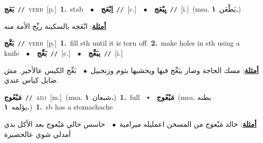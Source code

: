 \documentclass[10pt,a4paper,twoside]{article} %
\begin{document}
\begin{multicols}{2}
{\setlength\topsep{0pt}\textbf{\foreignlanguage{arabic}{بَعَج}}\ {\color{gray}\texttt{//}\color{black}}\ \textsc{verb}\ [p.]\ \textbf{1.}~stab\ \ $\bullet$\ \ \setlength\topsep{0pt}\textbf{\foreignlanguage{arabic}{اِبْعَج}}\ {\color{gray}\texttt{//}\color{black}}\ [c.]\ \ $\bullet$\ \ \setlength\topsep{0pt}\textbf{\foreignlanguage{arabic}{يِبْعَج}}\ {\color{gray}\texttt{//}\color{black}}\ [i.]\ \color{gray}(msa. \foreignlanguage{arabic}{يَطْعَن}~\foreignlanguage{arabic}{\textbf{١.}})\color{black}\  \begin{flushright}\color{gray}\foreignlanguage{arabic}{\textbf{\underline{\foreignlanguage{arabic}{أمثلة}}}: ابْعَجه بالسكينة ريِّح الأمة منه}\end{flushright}\color{black}} \vspace{2mm}

{\setlength\topsep{0pt}\textbf{\foreignlanguage{arabic}{بَعَّج}}\ {\color{gray}\texttt{//}\color{black}}\ \textsc{verb}\ [p.]\ \textbf{1.}~fill sth until it is torn off.  \textbf{2.}~make holes in sth using a knife\ \ $\bullet$\ \ \setlength\topsep{0pt}\textbf{\foreignlanguage{arabic}{بَعِّج}}\ {\color{gray}\texttt{//}\color{black}}\ [c.]\ \ $\bullet$\ \ \setlength\topsep{0pt}\textbf{\foreignlanguage{arabic}{يبَعِّج}}\ {\color{gray}\texttt{//}\color{black}}\ [i.]\  \begin{flushright}\color{gray}\foreignlanguage{arabic}{\textbf{\underline{\foreignlanguage{arabic}{أمثلة}}}: مسك الجاجة وصار يبَعِّج فيها ويحشيها بثوم وزنجبيل\ $\bullet$\ \  بَعِّج الكيس عالأخير. مش ضايل كياس عندي.}\end{flushright}\color{black}} \vspace{2mm}

{\setlength\topsep{0pt}\textbf{\foreignlanguage{arabic}{مَبْعُوج}}\ {\color{gray}\texttt{//}\color{black}}\ \textsc{adj}\ [m.]\ \color{gray}(msa. \foreignlanguage{arabic}{شبعان}~\foreignlanguage{arabic}{\textbf{١.}})\color{black}\ \textbf{1.}~full\ \ $\smblkdiamond$\ \ \setlength\topsep{0pt}\textbf{\foreignlanguage{arabic}{مَبْعُوج}}\ \color{gray}(msa. \foreignlanguage{arabic}{بطنه يؤلمه}~\foreignlanguage{arabic}{\textbf{١.}})\color{black}\ \textbf{1.}~sb has a stomachache\  \begin{flushright}\color{gray}\foreignlanguage{arabic}{\textbf{\underline{\foreignlanguage{arabic}{أمثلة}}}: خالد مَبْعوج من المسخن اعمليله ميرامية\ $\bullet$\ \  حاسس حالي مَبْعوج بعد الأكل بدي أمدلي شوي عالحصيرة}\end{flushright}\color{black}} \vspace{2mm}


\end{multicols}
\end{document}
